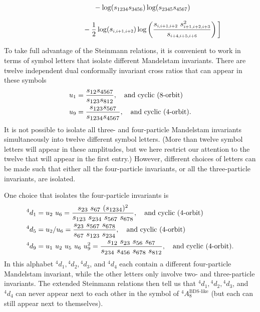 \documentclass[11pt]{article}
\def\mand#1{\scaleto{s}{4.6pt}_{\scaleto{#1}{5.2pt}}}
\begin{document}
 \begin{align*}
 &\ \hspace{1.4cm}- \log(s_{\scaleto{1234}{4.4pt}} s_{\scaleto{3456}{4.4pt}}) \log(s_{\scaleto{2345}{4.4pt}} s_{\scaleto{4567}{4.4pt}}) \nonumber
 \end{align*}
 
 \begin{align*}
&\ \hspace{2.4cm}- \frac12 \log(\mand{i,i+1,i+2}) \log\left(\frac{\mand{i,i+1,i+2} \ \mand{i+1,i+2,i+3}^2}{\mand{i+4,i+5,i+6}}\right) \bigg] \nonumber
 \end{align*}
 
 To take full advantage of the Steinmann relations, it is convenient to work in terms of symbol letters that isolate different Mandelstam invariants. There are twelve independent dual conformally invariant cross ratios that can appear in these symbols
\begin{align}
u_1 &= \frac{\mand{12} \mand{4567}}{\mand{123} \mand{812}}, \quad \text{and cyclic (8-orbit)} \\
u_9 &= \frac{\mand{123} \mand{567}}{\mand{1234} \mand{4567}}, \quad \text{and cyclic (4-orbit).}
\end{align}
It is not possible to isolate all three- and four-particle Mandelstam invariants simultaneously into twelve different symbol letters. (More than twelve symbol letters will appear in these amplitudes, but we here restrict our attention to the twelve that will appear in the first entry.) However, different choices of letters can be made such that either all the four-particle invariants, or all the three-particle invariants, are isolated.

One choice that isolates the four-particle invariants is
\begin{align}
{}^4 d_1 &= u_2 \ u_6 = \frac{\mand{23} \ \mand{67} \ (\mand{1234})^2}{\mand{123} \ \mand{234} \ \mand{567} \ \mand{678}}, \quad \text{and cyclic (4-orbit)} \\
{}^4 d_5 &= u_2/u_6 = \frac{\mand{23} \ \mand{567} \ \mand{678}}{\mand{67} \ \mand{123} \ \mand{234}}, \quad \text{and cyclic (4-orbit)} \\
{}^4 d_9 &= u_1 \ u_2 \ u_5 \ u_6 \ u_9^2 = \frac{\mand{12} \ \mand{23} \ \mand{56} \ \mand{67}}{\mand{234} \ \mand{456} \ \mand{678} \ \mand{812}}, \quad \text{and cyclic (4-orbit)}.
\end{align}
In this alphabet ${}^4 d_1, {}^4 d_2, {}^4 d_3$, and ${}^4 d_4$ each contain a different four-particle Mandelstam invariant, while the other letters only involve two- and three-particle invariants. The extended Steinmann relations then tell us that ${}^4 d_1, {}^4 d_2, {}^4 d_3$, and ${}^4 d_4$ can never appear next to each other in the symbol of ${}^4 A^{\text{BDS-like}}_{8}$ (but each can still appear next to themselves).
\end{document}
